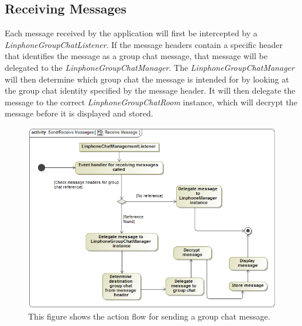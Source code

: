 \documentclass[11pt]{article}
\begin{document}
\subsection{Receiving Messages}
Each message received by the application will first be intercepted by a \textit{LinphoneGroupChatListener}. If the message headers contain a specific header that identifies the message as a group chat message, that message will be delegated to the \textit{LinphoneGroupChatManager}. The \textit{LinphoneGroupChatManager} will then determine which group chat the message is intended for by looking at the group chat identity specified by the message header. It will then delegate the message to the correct \textit{LinphoneGroupChatRoom} instance, which will decrypt the message before it is displayed and stored.
\begin{figure}[H]
\centering
\includegraphics[width=5in]{./images/activity_receive_message.png}
\caption[Receive Message Activity Diagram]{This figure shows the action flow for sending a group chat message.}
\label{ad-receive-message}
\end{figure}
\end{document}
